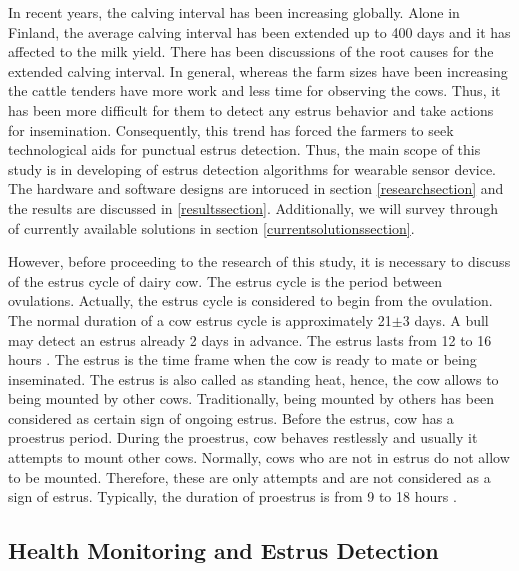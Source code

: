 \documentclass[english,12pt,a4paper,pdftex,elec,utf8]{aaltothesis}
\begin{document}
In recent years, the calving interval has been increasing globally. Alone in Finland, the average calving interval has been extended up to 400 days and it has affected to the milk yield. There has been discussions of the root causes for the extended calving interval. In general, whereas the farm sizes have been increasing the cattle tenders have more work and less time for observing the cows. Thus, it has been more difficult for them to detect any estrus behavior and take actions for insemination. Consequently, this trend has forced the farmers to seek technological aids for punctual estrus detection. Thus, the main scope of this study is in developing of estrus detection algorithms for wearable sensor device. The hardware and software designs are intoruced in section \ref{researchsection} and the results are discussed in \ref{resultssection}. Additionally, we will survey through of currently available solutions in section \ref{currentsolutionssection}.

However, before proceeding to the research of this study, it is necessary to discuss of the estrus cycle of dairy cow. The estrus cycle is the period between ovulations. Actually, the estrus cycle is considered to begin from the ovulation. The normal duration of a cow estrus cycle is approximately 21$\pm$3 days. A bull may detect an estrus already 2 days in advance. The estrus lasts from 12 to 16 hours \cite{julkaisuja52}. The estrus is the time frame when the cow is ready to mate or being inseminated. The estrus is also called as standing heat, hence, the cow allows to being mounted by other cows. Traditionally, being mounted by others has been considered as certain sign of ongoing estrus. Before the estrus, cow has a proestrus period. During the proestrus, cow behaves restlessly and usually it attempts to mount other cows. Normally, cows who are not in estrus do not allow to be mounted. Therefore, these are only attempts and are not considered as a sign of estrus. Typically, the duration of proestrus is from 9 to 18 hours \cite{lehmahavaintoja}.





\subsection{Health Monitoring and Estrus Detection} \label{healthmonitoringandestrusdetectionsection}
\end{document}
